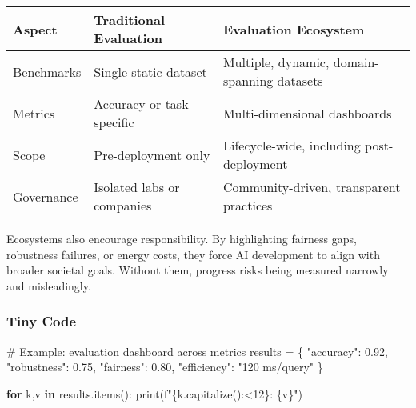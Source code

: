 \documentclass[
  letterpaper,
  DIV=11,
  numbers=noendperiod]{scrreprt}
\newenvironment{Shaded}{\begin{snugshade}}{\end{snugshade}}
\newcommand{\BuiltInTok}[1]{\textcolor[rgb]{0.00,0.23,0.31}{#1}}
\newcommand{\CommentTok}[1]{\textcolor[rgb]{0.37,0.37,0.37}{#1}}
\newcommand{\ControlFlowTok}[1]{\textcolor[rgb]{0.00,0.23,0.31}{\textbf{#1}}}
\newcommand{\FloatTok}[1]{\textcolor[rgb]{0.68,0.00,0.00}{#1}}
\newcommand{\KeywordTok}[1]{\textcolor[rgb]{0.00,0.23,0.31}{\textbf{#1}}}
\newcommand{\NormalTok}[1]{\textcolor[rgb]{0.00,0.23,0.31}{#1}}
\newcommand{\OperatorTok}[1]{\textcolor[rgb]{0.37,0.37,0.37}{#1}}
\newcommand{\SpecialCharTok}[1]{\textcolor[rgb]{0.37,0.37,0.37}{#1}}
\newcommand{\SpecialStringTok}[1]{\textcolor[rgb]{0.13,0.47,0.30}{#1}}
\newcommand{\StringTok}[1]{\textcolor[rgb]{0.13,0.47,0.30}{#1}}
\begin{document}
\begin{longtable}[]{@{}
  >{\raggedright\arraybackslash}p{}
  >{\raggedright\arraybackslash}p{}
  >{\raggedright\arraybackslash}p{}@{}}
\toprule\noalign{}
\begin{minipage}[b]{\linewidth}\raggedright
Aspect
\end{minipage} & \begin{minipage}[b]{\linewidth}\raggedright
Traditional Evaluation
\end{minipage} & \begin{minipage}[b]{\linewidth}\raggedright
Evaluation Ecosystem
\end{minipage} \\
\midrule\noalign{}
\endhead
\bottomrule\noalign{}
\endlastfoot
Benchmarks & Single static dataset & Multiple, dynamic, domain-spanning
datasets \\
Metrics & Accuracy or task-specific & Multi-dimensional dashboards \\
Scope & Pre-deployment only & Lifecycle-wide, including
post-deployment \\
Governance & Isolated labs or companies & Community-driven, transparent
practices \\
\end{longtable}

Ecosystems also encourage responsibility. By highlighting fairness gaps,
robustness failures, or energy costs, they force AI development to align
with broader societal goals. Without them, progress risks being measured
narrowly and misleadingly.

\subsubsection{Tiny Code}\label{tiny-code-89}

\begin{Shaded}
\begin{Highlighting}[]
\CommentTok{\# Example: evaluation dashboard across metrics}
\NormalTok{results }\OperatorTok{=}\NormalTok{ \{}
    \StringTok{"accuracy"}\NormalTok{: }\FloatTok{0.92}\NormalTok{,}
    \StringTok{"robustness"}\NormalTok{: }\FloatTok{0.75}\NormalTok{,}
    \StringTok{"fairness"}\NormalTok{: }\FloatTok{0.80}\NormalTok{,}
    \StringTok{"efficiency"}\NormalTok{: }\StringTok{"120 ms/query"}
\NormalTok{\}}

\ControlFlowTok{for}\NormalTok{ k,v }\KeywordTok{in}\NormalTok{ results.items():}
    \BuiltInTok{print}\NormalTok{(}\SpecialStringTok{f"}\SpecialCharTok{\{}\NormalTok{k}\SpecialCharTok{.}\NormalTok{capitalize()}\SpecialCharTok{:\textless{}12\}}\SpecialStringTok{: }\SpecialCharTok{\{}\NormalTok{v}\SpecialCharTok{\}}\SpecialStringTok{"}\NormalTok{)}
\end{Highlighting}
\end{Shaded}
\end{document}
